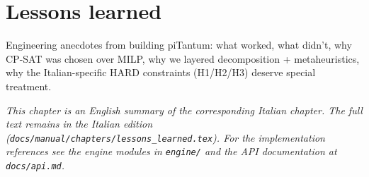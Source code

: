 \chapter{Lessons learned}
\label{ch:lessons_learned_en}

Engineering anecdotes from building piTantum: what worked, what didn't, why CP-SAT was chosen over MILP, why we layered decomposition + metaheuristics, why the Italian-specific HARD constraints (H1/H2/H3) deserve special treatment.

\medskip
\noindent
\textit{This chapter is an English summary of the corresponding Italian chapter. The full text remains in the Italian edition (\texttt{docs/manual/chapters/lessons\_learned.tex}). For the implementation references see the engine modules in \texttt{engine/} and the API documentation at \texttt{docs/api.md}.}
